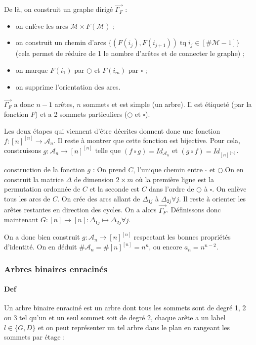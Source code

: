 \documentclass{article}
\DeclareMathOperator{\tq}{\text{ tq }}
\begin{document}
			De là, on construit un graphe dirigé $\vec {\Gamma_F}$ :

				\begin{itemize}
					\item on enlève les arcs $\mathcal M \times F(\mathcal M)$ ;
					\item on construit un chemin d'arcs $\{(F(i_j), F(i_{j+1})) \tq i_j \in [\#\mathcal M - 1]\}$ (cela permet de réduire de 1 le nombre 
						  d'arêtes et de connecter le graphe) ;
					\item on marque $F(i_1)$ par $\bigcirc$ et $F(i_m)$ par $\square$ ;
						\item on supprime l'orientation des arcs.
				\end{itemize}

			$\vec {\Gamma_F}$ a donc $n-1$ arêtes, $n$ sommets et est simple (un arbre). Il est étiqueté (par la fonction $F$) et a 2 sommets particuliers
			($\bigcirc$ et $\square$).
			
			Les deux étapes qui viennent d'être décrites donnent donc une fonction $f : [n]^{[n]} \to \mathcal A_n$. Il reste à montrer que cette fonction est bijective.
			Pour cela, construisons $g : \mathcal A_n \to [n]^{[n]}$ telle que $(f \circ g) = Id_{\mathcal A_n}$ et $(g \circ f) = Id_{[n]^{[n]}}$.

			\underline{construction de la fonction $g$ : } On prend $C$, l'unique chemin entre $\square$ et $\bigcirc$.On en construit la matrice $\Delta$ de dimension
			$2 \times m$ où la première ligne est la permutation ordonnée de $C$ et la seconde est $C$ dans l'ordre de $\bigcirc$ à $\square$. On enlève tous les arcs de $C$.
			On crée des arcs allant de $\Delta_{1j}$ à $\Delta_{2j} \forall j$. Il reste à orienter les arêtes restantes en direction des cycles. On a alors $\vec {\Gamma_F}$.
			Définissons donc maintenant $G : [n] \to [n] : \Delta_{1j} \mapsto \Delta_{2j} \forall j$.
			
			On a donc bien construit $g : \mathcal A_n \to [n]^{[n]}$ respectant les bonnes propriétés d'identité. On en déduit $\#\mathcal A_n = \#[n]^{[n]} = n^n$,
			ou encore $a_n = n^{n-2}$.

			\subsubsection{Arbres binaires enracinés} %

			\paragraph{Def} Un arbre binaire enraciné est un arbre dont tous les sommets sont de degré 1, 2 ou 3 tel qu'un et un seul sommet soit de degré 2, chaque arête a un
			label $l \in \{G, D\}$ et on peut représenter un tel arbre dans le plan en rangeant les sommets par étage :
\end{document}
